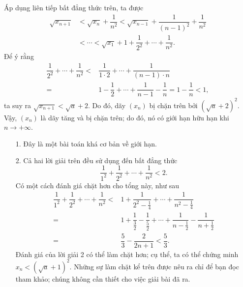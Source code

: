 \begin{bt}
{		Áp dụng liên tiếp bất đẳng thức trên, ta được
		{\allowdisplaybreaks
			\begin{align*}
			\sqrt{x_{n+1}}&<\sqrt{x_n}+\dfrac{1}{n^2}<\sqrt{x_{n-1}}+\dfrac{1}{(n-1)^2}+\dfrac{1}{n^2}\\
			&<\cdots<\sqrt{x_1}+1+\dfrac{1}{2^2}+\cdots +\dfrac{1}{n^2}.
			\end{align*}}Để ý rằng
		{\allowdisplaybreaks
			\begin{align*}
			\dfrac{1}{2^2}+\cdots +\dfrac{1}{n^2}<&\dfrac{1}{1\cdot 2}+\cdots+\dfrac{1}{(n-1)\cdot n}\\
			=&1-\dfrac{1}{2}+\cdots+\dfrac{1}{n-1}-\dfrac{1}{n}=1-\dfrac{1}{n}<1,
			\end{align*}}ta suy ra $\sqrt{x_{n+1}}<\sqrt{a}+2$.
		Do đó, dãy $(x_n)$ bị chặn trên bởi $\left(\sqrt{a}+2\right)^2$. Vậy, $(x_n)$ là dãy tăng và bị chặn trên; do đó, nó có giới hạn hữu hạn khi $n\rightarrow +\infty$.
		\begin{nx}\hfill
			\begin{enumerate}
				\item[1.] Đây là một bài toán khá cơ bản về giới hạn. %
				\item[2.] Cả hai lời giải trên đều sử dụng đến bất đẳng thức
				\[\dfrac{1}{1^2}+\dfrac{1}{2^2}+\cdots + \dfrac{1}{n^2}<2.\]
				Có một cách đánh giá chặt hơn cho tổng này, như sau
				{\allowdisplaybreaks
					\begin{align*}
					\dfrac{1}{1^2}+\dfrac{1}{2^2}+\cdots +\dfrac{1}{n^2}<&1+\dfrac{1}{2^2-\tfrac{1}{4}}+\cdots+\dfrac{1}{n^2-\tfrac{1}{4}}\\
					=&1+\dfrac{1}{\tfrac{3}{2}}-\dfrac{1}{\tfrac{5}{2}}+\cdots+\dfrac{1}{n-\tfrac{1}{2}}-\dfrac{1}{n+\tfrac{1}{2}}\\
					=&\dfrac{5}{3}-\dfrac{2}{2n+1}<\dfrac{5}{3}.
					\end{align*}}%
				Đánh giá của lời giải 2 có thể làm chặt hơn; cụ thể, ta có thể chứng minh $x_n<\left(\sqrt{a}+1\right)^2$.
				Những sự làm chặt kể trên được nêu ra chỉ để bạn đọc tham khảo; chúng không cần thiết cho việc giải bài đã ra.
			\end{enumerate}
		\end{nx}
	}
\end{bt}


